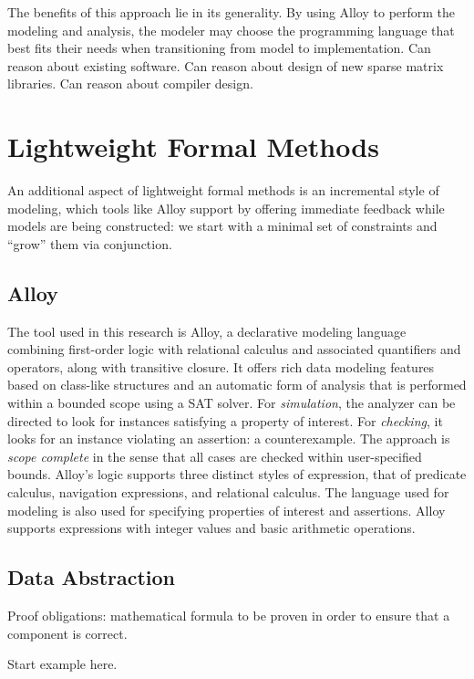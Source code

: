 \documentclass[11pt,conference]{IEEEtran}
\begin{document}
The benefits of this approach lie in its generality.  By using Alloy to perform the modeling and analysis, the modeler may choose the programming language that best fits their needs when transitioning from model to implementation.
Can reason about existing software.
Can reason about design of new sparse matrix libraries.
Can reason about compiler design.

\section{Lightweight Formal Methods}

An additional aspect of lightweight formal methods is an incremental style of modeling, which tools like Alloy support by offering immediate feedback while models are being constructed: we start with a minimal set of constraints and ``grow'' them via conjunction.

\subsection{Alloy}

The tool used in this research is Alloy, a declarative modeling language combining first-order logic with relational calculus and associated quantifiers and operators, along with transitive closure.  It offers rich data modeling features based on class-like structures and an automatic form of analysis that is performed within a bounded scope using a SAT solver.  For \emph{simulation}, the analyzer can be directed to look for instances satisfying a property of interest.  For \emph{checking}, it looks for an instance violating an assertion: a counterexample.  The approach is \emph{scope complete} in the sense that all cases are checked within user-specified bounds.  Alloy's logic supports three distinct styles of expression, that of predicate calculus, navigation expressions, and relational calculus.  The language used for modeling is also used for specifying properties of interest and assertions.  Alloy supports expressions with integer values and basic arithmetic operations.

\subsection{Data Abstraction}

Proof obligations: mathematical formula to be proven in order to ensure that a component is correct.

Start example here.
\end{document}
